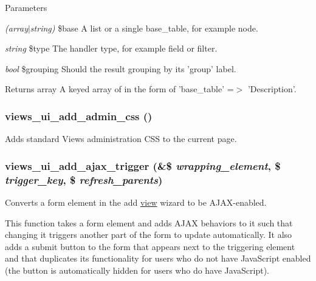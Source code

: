 \begin{DoxyParams}{Parameters}
\item[{\em (array$|$string)}]\$base A list or a single base\_\-table, for example node. \item[{\em string}]\$type The handler type, for example field or filter. \item[{\em bool}]\$grouping Should the result grouping by its 'group' label.\end{DoxyParams}
\begin{DoxyReturn}{Returns}
array A keyed array of in the form of 'base\_\-table' =$>$ 'Description'. 
\end{DoxyReturn}
\hypertarget{admin_8inc_ac18cddd43c4306013528dbdb6acad1cb}{
\subsubsection[{views\_\-ui\_\-add\_\-admin\_\-css}]{\setlength{\rightskip}{0pt plus 5cm}views\_\-ui\_\-add\_\-admin\_\-css ()}}
\label{admin_8inc_ac18cddd43c4306013528dbdb6acad1cb}
Adds standard Views administration CSS to the current page. \hypertarget{admin_8inc_a2f6e0bb2277ca811077c8cf19e909069}{
\subsubsection[{views\_\-ui\_\-add\_\-ajax\_\-trigger}]{\setlength{\rightskip}{0pt plus 5cm}views\_\-ui\_\-add\_\-ajax\_\-trigger (\&\$ {\em wrapping\_\-element}, \/  \$ {\em trigger\_\-key}, \/  \$ {\em refresh\_\-parents})}}
\label{admin_8inc_a2f6e0bb2277ca811077c8cf19e909069}
Converts a form element in the add \hyperlink{classview}{view} wizard to be AJAX-\/enabled.

This function takes a form element and adds AJAX behaviors to it such that changing it triggers another part of the form to update automatically. It also adds a submit button to the form that appears next to the triggering element and that duplicates its functionality for users who do not have JavaScript enabled (the button is automatically hidden for users who do have JavaScript).

